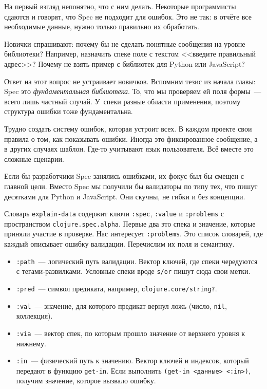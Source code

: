 
На первый взгляд непонятно, что с ним делать. Некоторые программисты сдаются и
говорят, что Spec не подходит для ошибок. Это не так: в отчёте все
необходимые данные, нужно только правильно их обработать.

Новички спрашивают: почему бы не сделать понятные сообщения на уровне
библиотеки? Например, назначить спеке поле с текстом <<введите правильный
адрес>>? Почему не взять пример с библиотек для Python или JavaScript?


Ответ на этот вопрос не устраивает новичков. Вспомним тезис из начала главы:
Spec это \emph{фундаментальная библиотека}. То, что мы проверяем ей поля
формы~--- всего лишь частный случай. У~спеки разные области применения, поэтому
структура ошибки тоже фундаментальна.

Трудно создать систему ошибок, которая устроит всех. В каждом проекте свои
правила о том, как показывать ошибки. Иногда это фиксированное сообщение, а в
других случаях шаблон. Где-то учитывают язык пользователя. Всё вместе это
сложные сценарии.

Если бы разработчики Spec занялись ошибками, их фокус был бы смещен с главной
цели. Вместо Spec мы получили бы валидаторы по типу тех, что пишут десятками для
Python и JavaScript. Они скучны, не гибки и без концепции.

Словарь \verb|explain-data| содержит ключи \verb|:spec|, \verb|:value| и
\verb|:problems| с пространством \verb|clojure.spec.alpha|. Первые два это
спека и значение, которые приняли участие в проверке. Нас интересует
\verb|:problems|. Это список словарей, где каждый описывает ошибку
валидации. Перечислим их поля и семантику.


\begin{itemize}

\item
  \verb|:path|~--- логический путь валидации. Вектор ключей, где спеки
  чередуются с тегами-развилками. Условные спеки вроде \verb|s/or| пишут сюда
  свои метки.

\item
  \verb|:pred|~--- символ предиката, например, \verb|clojure.core/string?|.

\item
  \verb|:val|~--- значение, для которого предикат вернул ложь (число,
  \verb|nil|, коллекция).

\item
  \verb|:via|~--- вектор спек, по которым прошло значение от верхнего уровня к
  нижнему.

\item
  \verb|:in|~--- физический путь к значению. Вектор ключей и индексов, который
  передают в функцию \verb|get-in|. Если выполнить \verb|(get-in <данные> <:in>)|,
  получим значение, которое вызвало ошибку.

\end{itemize}

